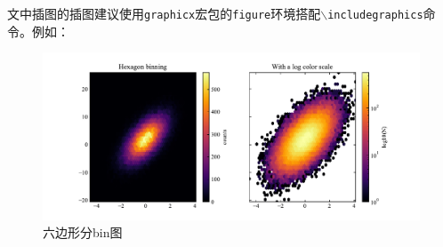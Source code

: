 文中插图的插图建议使用\texttt{graphicx}宏包的\texttt{figure}环境搭配\texttt{$\backslash$includegraphics}命令。例如：
\begin{figure}[!htp]
	\centering
	\includegraphics[width=1\textwidth]{figures/hexbin.pdf}
	\caption{六边形分bin图}
	\label{fig:hexbin}
\end{figure}

